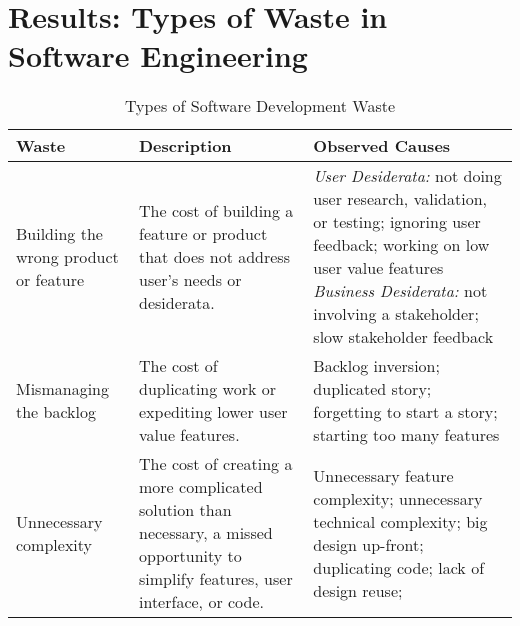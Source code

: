 \section{Results: Types of Waste in Software Engineering}
\label{SEWaste}

\begin{table}[t]
\renewcommand{\arraystretch}{1.3}
\centering
\caption{Types of Software Development Waste}
\label{Waste}
\begin{tabular}{|p{1.5in}|p{1.6in}|p{2.8in}|}
\hline
Waste                                 & Description                                                                                                         & Observed Causes                                                                                                                                                                                                                                                                                                                                                                                                                     \\ \hline
Building the wrong product or feature & The cost of building a feature or product that does not address user's needs or desiderata.                                  & \textit{User Desiderata:} not doing user research, validation, or testing; ignoring user feedback; working on low user value features \newline \textit{Business Desiderata:} not involving a stakeholder; slow stakeholder feedback                                                                                                                                                                                  \\ \hline
Mismanaging the backlog               & The cost of duplicating work or expediting lower user value features.                                                       & Backlog inversion; duplicated story; forgetting to start a story; starting too many features                                                                                                                                                                                                                                                                                                                                         \\ \hline
Unnecessary complexity  & The cost of creating a more complicated solution than necessary,  a missed opportunity to simplify features, user interface, or code.      & Unnecessary feature complexity; unnecessary technical complexity; big design up-front; duplicating code; lack of design reuse;                                                                                                                                                                                                                                                                                                                 \\ \hline

\end{tabular}
\end{table}
